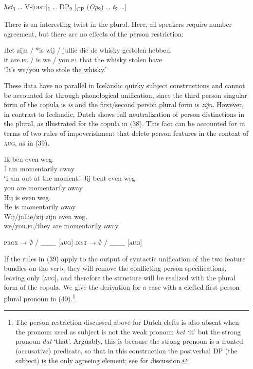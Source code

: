 \documentclass[output=paper]{langsci/langscibook}
\begin{document}
\ea 
 \textit{het}\textsubscript{1} … V-[\textsc{dist}]\textsubscript{1} … DP\textsubscript{2} [\textsubscript{CP} (\textit{Op}\textsubscript{2}) … \textit{t}\textsubscript{2} …]
\z

There is an interesting twist in the plural. Here, all speakers require number agreement, but there are no effects of the person restriction:

\ea 
 \gll  Het zijn / *is   wij / jullie  die  de  whisky gestolen hebben.\\
      it    are.\textsc{pl} / is we / you.\textsc{pl} that the whisky stolen     have\\
 \glt    ‘It’s we/you who stole the whisky.’
\z



These data have no parallel in Icelandic quirky subject constructions and cannot be accounted for through phonological unification, since the third person singular form of the copula is \textit{is} and the first/second person plural form is \textit{zijn}. However, in contrast to Icelandic, Dutch shows full neutralization of person distinctions in the plural, as illustrated for the copula in (38). This fact can be accounted for in terms of two rules of impoverishment that delete person features in the context of \textsc{aug}, as in (39).

\ea \label{bkm:Ref295574585}  
\ea \gll Ik ben even              weg.\\
    I   am  momentarily away\\
\glt ‘I am out at the moment.’
\ex \gll Jij   bent even              weg.\\
    you are   momentarily away\\
\ex \gll  Hij is even             weg.\\
He is momentarily away\\
\ex \gll  Wij/jullie/zij     zijn even              weg.\\
    we/you.\textsc{pl}/they are   momentarily away\\
\z \z

\ea \label{bkm:Ref328734023}\label{bkm:Ref295642138}  
\ea \textsc{prox} → $\emptyset$ / \_\_\_ [\textsc{aug}]
\ex \textsc{dist} → $\emptyset$ / \_\_\_ [\textsc{aug}]
\z
\z

If the rules in (39) apply to the output of syntactic unification of the two feature bundles on the verb, they will remove the conflicting person specifications, leaving only [\textsc{aug}], and therefore the structure will be realized with the plural form of the copula. We give the derivation for a case with a clefted first person plural pronoun in (40).\footnote{The person restriction discussed above for Dutch clefts is also absent when the pronoun used as subject is not the weak pronoun \textit{het} ‘it’ but the strong pronoun \textit{dat} ‘that’. Arguably, this is because the strong pronoun is a fronted (accusative) predicate, so that in this construction the postverbal DP (the subject) is the only agreeing element; see \citet{Ackema2018} for discussion.}
\end{document}
